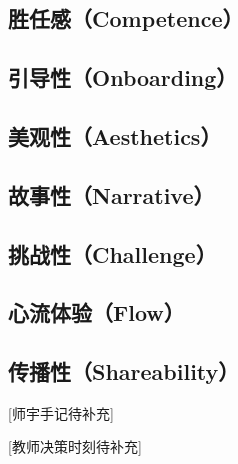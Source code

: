 \subsection{胜任感（Competence）}

\subsection{引导性（Onboarding）}

\subsection{美观性（Aesthetics）}

\subsection{故事性（Narrative）}

\subsection{挑战性（Challenge）}

\subsection{心流体验（Flow）}

\subsection{传播性（Shareability）}

\begin{shiyu-note}
{\small\color{muted} [师宇手记待补充]}
\end{shiyu-note}

\begin{decision-point}
{\small\color{muted} [教师决策时刻待补充]}
\end{decision-point}